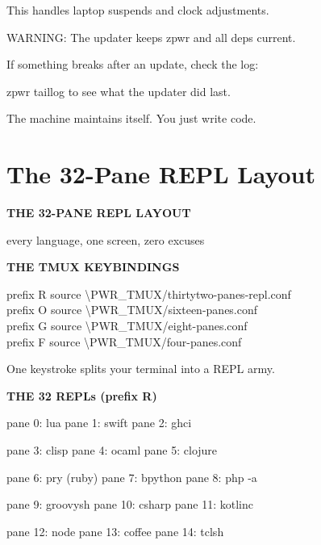 \documentclass[11pt,a4paper,twoside]{book}
\begin{document}
This handles laptop suspends and clock adjustments.

WARNING: The updater keeps zpwr and all deps current.

If something breaks after an update, check the log:

zpwr taillog  to see what the updater did last.

The machine maintains itself. You just write code.


\vspace{16pt}

\section{The 32-Pane REPL Layout}


\vspace{10pt}
{\large\bfseries\color{neoncyan} THE 32-PANE REPL LAYOUT}\vspace{6pt}

every language, one screen, zero excuses


\vspace{12pt}
{\bfseries\color{neonyellow} THE TMUX KEYBINDINGS}\vspace{4pt}

\begin{codebox}
prefix R  source \textbackslash{}PWR\_TMUX/thirtytwo-panes-repl.conf\\
prefix O  source \textbackslash{}PWR\_TMUX/sixteen-panes.conf\\
prefix G  source \textbackslash{}PWR\_TMUX/eight-panes.conf\\
prefix F  source \textbackslash{}PWR\_TMUX/four-panes.conf\\
\end{codebox}

One keystroke splits your terminal into a REPL army.


\vspace{12pt}
{\bfseries\color{neonyellow} THE 32 REPLs (prefix R)}\vspace{4pt}

pane 0:  lua          pane 1:  swift        pane 2:  ghci

pane 3:  clisp        pane 4:  ocaml        pane 5:  clojure

pane 6:  pry (ruby)   pane 7:  bpython      pane 8:  php -a

pane 9:  groovysh     pane 10: csharp       pane 11: kotlinc

pane 12: node         pane 13: coffee       pane 14: tclsh
\end{document}
